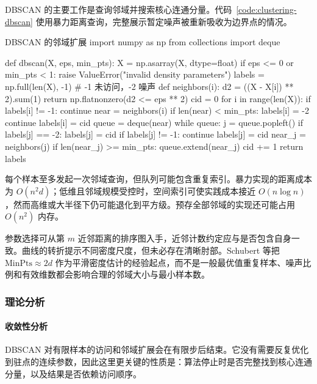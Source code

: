 DBSCAN 的主要工作是查询邻域并搜索核心连通分量。代码~\ref{code:clustering-dbscan} 使用暴力距离查询，完整展示暂定噪声被重新吸收为边界点的情况。

\begin{codeblock}[language=Python,label={code:clustering-dbscan}]{DBSCAN 的邻域扩展}
import numpy as np
from collections import deque

def dbscan(X, eps, min_pts):
    X = np.asarray(X, dtype=float)
    if eps <= 0 or min_pts < 1:
        raise ValueError("invalid density parameters")
    labels = np.full(len(X), -1)  # -1 未访问，-2 噪声
    def neighbors(i):
        d2 = ((X - X[i]) ** 2).sum(1)
        return np.flatnonzero(d2 <= eps ** 2)
    cid = 0
    for i in range(len(X)):
        if labels[i] != -1:
            continue
        near = neighbors(i)
        if len(near) < min_pts:
            labels[i] = -2
            continue
        labels[i] = cid
        queue = deque(near)
        while queue:
            j = queue.popleft()
            if labels[j] == -2:
                labels[j] = cid
            if labels[j] != -1:
                continue
            labels[j] = cid
            near_j = neighbors(j)
            if len(near_j) >= min_pts:
                queue.extend(near_j)
        cid += 1
    return labels
\end{codeblock}

每个样本至多发起一次邻域查询，但队列可能包含重复索引。暴力实现的距离成本为 $O(n^2d)$；低维且邻域规模受控时，空间索引可使实践成本接近 $O(n\log n)$，然而高维或大半径下仍可能退化到平方级。预存全部邻域的实现还可能占用 $O(n^2)$ 内存。

参数选择可从第 $m$ 近邻距离的排序图入手，近邻计数约定应与是否包含自身一致。曲线的转折提示不同密度尺度，但未必存在清晰肘部。Schubert 等把 $\mathrm{MinPts}\approx 2d$ 作为平滑密度估计的经验起点，而不是一般最优值重复样本、噪声比例和有效维数都会影响合理的邻域大小与最小样本数。

\subsubsection{理论分析}

\paragraph{收敛性分析}
DBSCAN 对有限样本的访问和邻域扩展会在有限步后结束。它没有需要反复优化到驻点的连续参数，因此这里更关键的性质是：算法停止时是否完整找到核心连通分量，以及结果是否依赖访问顺序。

